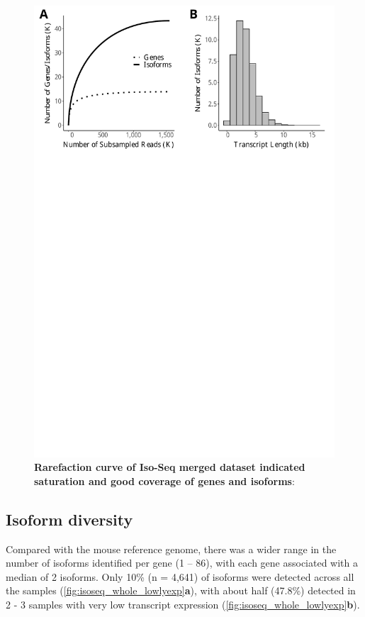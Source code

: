 \begin{figure}[htp]
	\begin{center}
		\includegraphics[page=3,scale = 0.55]{Figures/IsoSeqWholeTranscriptome.pdf}
	\end{center}
	\captionsetup{width=0.95\textwidth}
	\caption[Rarefaction Curves of Whole Transcriptome Iso-Seq Runs]%
	{\textbf{Rarefaction curve of Iso-Seq merged dataset indicated saturation and good coverage of genes and isoforms}:}
	\label{fig:isoseq_whole_rarefaction}
\end{figure}

\newpage
\subsection{Isoform diversity}
Compared with the mouse reference genome, there was a wider range in the number of isoforms identified per gene (1 – 86), with each gene associated with a median of 2 isoforms. Only 10\% (n = 4,641) of isoforms were detected across all the samples (\cref{fig:isoseq_whole_lowlyexp}\textbf{a}), with about half (47.8\%) detected in 2 - 3 samples with very low transcript expression (\cref{fig:isoseq_whole_lowlyexp}\textbf{b}).

